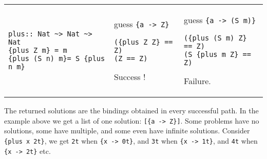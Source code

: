 \documentclass[11pt,twoside]{article}
\begin{document}
\vspace*{.20in}
\begin{tabular}{l|l|l}
\begin{minipage}[t]{2.25in}
{ %
\begin{verbatim}
plus:: Nat ~> Nat ~> Nat
{plus Z m} = m
{plus (S n) m}= S {plus n m}
\end{verbatim}}
\end{minipage}
&
\begin{minipage}[t]{1.5in}
{ %
guess \verb+{a -> Z}+
\begin{verbatim}
({plus Z Z} == Z)
(Z == Z)
\end{verbatim}}
Success !
\end{minipage}
&
\begin{minipage}[t]{1.6in}
{ %
guess \verb+{a -> (S m)}+
\begin{verbatim}
({plus (S m) Z} == Z)
(S {plus m Z} == Z)
\end{verbatim}}
Failure.
\end{minipage}
\end{tabular}

\vspace*{0.15in}

The returned solutions are the bindings obtained in every
successful path. In the example above we get a list of one
solution: \verb+[{a -> Z}]+. Some problems have no
solutions, some have multiple, and some even have infinite
solutions. Consider  \verb+{plus x 2t}+, we get
\verb+2t+ when \verb+{x -> 0t}+, and
\verb+3t+ when \verb+{x -> 1t}+, and
\verb+4t+ when \verb+{x -> 2t}+ etc.
\end{document}
